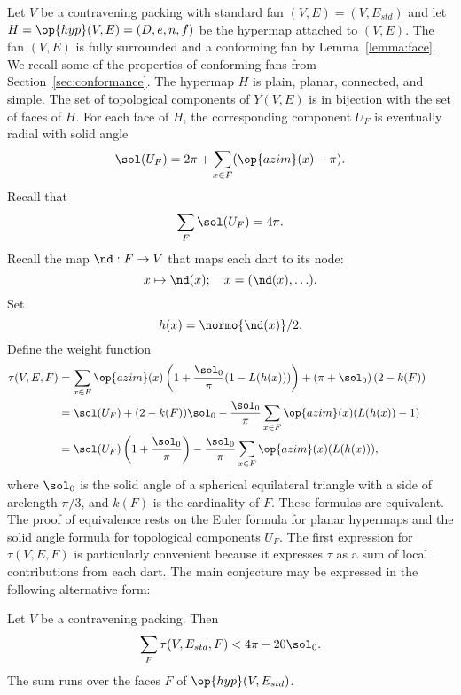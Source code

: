 Let $V$ be a contravening packing with standard fan
$(V,E)=(V,E_{std})$ and let $H=\op{hyp}(V,E)=(D,e,n,f)$ be the
hypermap attached to $(V,E)$.  The fan $(V,E)$ is fully surrounded and
a conforming fan by Lemma~\ref{lemma:face}.  We recall some of the
properties of conforming fans from Section~\ref{sec:conformance}.  The
hypermap $H$ is plain, planar, connected, and simple.  The set of
topological components of $Y(V,E)$ is in bijection with the set of
faces of $H$.  %
For each face of $H$, the corresponding component $U_F$ is eventually
radial with solid angle 
%
%
 
\[ 
\sol(U_F) = 2\pi + \sum_{x\in F} (\op{azim}(x) -\pi).
\] 
Recall that
\[ \sum_{F} \sol(U_F) = 4\pi.\] 
Recall the map $\nd:F\to V$ that maps each dart to its node:
\[ 
x \mapsto \nd(x); \quad   x = (\nd(x),\ldots).
\] 
Set 
\[ h(x) = \normo{\nd(x)}/2.\] 
Define the weight function
\begin{align}
  \tau(V,E,F) &=\sum_{x\in F} \op{azim}(x)
  \left(1 + \dfrac{\sol_0}{\pi}(1- L(h(x)))\right) 
  + \left(\pi+{\sol_0}\right) (2- k(F))\qquad\phantom{t}\vspace{6pt}\nonumber\\
  &= \sol(U_F) + (2- k(F))\sol_0 - \dfrac{\sol_0}{\pi}
\sum_{x\in F}\op{azim}(x) (L(h(x)) - 1)\vspace{6pt}\nonumber\\
  &= \sol(U_F) \left( 1 + \dfrac{\sol_0}{\pi}\right) 
- \dfrac{\sol_0}{\pi} \sum_{x\in F} \op{azim}(x)(L(h(x))),\label{eqn:tau-sol}
\end{align}
where $\sol_0$ is the solid angle of a spherical equilateral triangle with a side of arclength $\pi/3$, and $k(F)$ is the cardinality of $F$.
% 
These formulas are equivalent.  The proof of equivalence rests on the
Euler formula for planar hypermaps and the solid angle formula for
topological components $U_F$.  The first expression for $\tau(V,E,F)$
is particularly convenient because it expresses $\tau$ as a sum of
local contributions from each dart.  %
%
%
The main conjecture may be expressed in the following alternative
form:

\begin{lemma}[target]\label{lemma:4pi-sol}
Let $V$ be a contravening packing. %
Then
\[ 
\sum_F \tau (V,E_{std},F) < 4\pi - 20\sol_0.
\] 
The sum runs over the faces $F$ of $\op{hyp}(V,E_{std})$.
\end{lemma}

